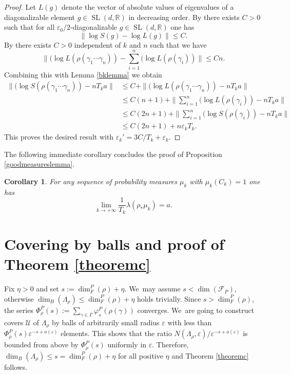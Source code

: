 \documentclass[JEP,XML,SOM,Unicode,NoEqCountersInSection,published]{cedram}
\let\ts\textstyle
\let\epsilon\varepsilon
\newtheorem{corollary}[theorem]{Corollary}
\newcommand{\R}{\mathbb{R}}
\newcommand{\F}{\mathcal{F}}
\newcommand{\U}{\mathcal U}
\let\e\varepsilon
\let\La\Lambda
\DeclareMathOperator{\SL}{SL}
\begin{document}
\begin{proof}
Let \(L(g)\) denote the vector of absolute values of eigenvalues of a diagonalizable element \(g \in \SL(d,\R)\) in decreasing order.
By \cite[Lem.\,2.16]{2021breuillard-sert} there exists \(C > 0\) such that for all \(\e_0/2\)-diagonalizable \(g \in \SL(d,\R)\) one has
\[
\|\log S(g) - \log L(g)\| \le C.
\]
By \cite[Prop.\,2.17]{2021breuillard-sert} there exists \(C > 0\) independent of \(k\) and \(n\) such that we have
\[
\|\ts (\log L(\rho(\gamma_1\cdots \gamma_n)) - \sum_{i = 1}^n (\log L (\rho(\gamma_i))\| \le Cn.
\]
Combining this with Lemma \ref{bklemma} we obtain
\begin{align*}\|(\log S(\rho(\gamma_1 \cdots \gamma_n)) - n T_k a\| &\le C + \|(\log L (\rho(\gamma_1\cdots \gamma_n))- nT_k a\|
\\ &\ts\le C(n+1) + \|\sum_{i = 1}^n(\log L (\rho(\gamma_i)) - nT_k a\|
\\ &\ts\le C(2n+1) + \|\sum_{i = 1}^n(\log S (\rho(\gamma_i))- nT_k a\|
\\ &\le C(2n+1) + n \epsilon_k T_k.
\end{align*}
This proves the desired result with \(\epsilon_k' = 3C / T_k + \epsilon_k\).
\end{proof}

The following immediate corollary concludes the proof of Proposition \ref{goodmeasureslemma}.

\begin{corollary}
For any sequence of probability measures \(\mu_k\) with \(\mu_k(C_k) = 1\) one has
\[
\lim_{k \to +\infty}\frac{1}{T_k}\lambda(\rho_*\mu_k) = a.
\]
\end{corollary}

\section{Covering by balls and proof of Theorem \ref{theoremc}}\label{prooftheoremc}

Fix \(\eta >0\) and set \(s:= \dim_F^P(\rho) + \eta \). We~may assume \(s <\dim (\F_{P}) \), otherwise \(\dim_B (\La_\rho) \leq \dim_F^P(\rho) + \eta \) holds trivially. Since \(s > \dim_F^P(\rho)\), the series
\(\Phi^P_\rho (s) := \sum_{\gamma \in \Gamma}\varphi_s^P(\rho(\gamma))\) converges. We~are going to construct covers \(\U\) of \(\La_\rho \) by balls of arbitrarily small radius \(\e\) with less than \(\Phi^P_\rho(s) \e^{-s+o(\e)}\) elements. This shows that the ratio \(N(\La_\rho, \e)/\e^{-s +o(\e)} \) is bounded from above by \(\Phi^P_\rho (s) \) uniformly in \(\e\). Therefore, \(\dim_B (\La_\rho) \leq s =\dim_F^P (\rho)+\eta\) for all positive \(\eta \) and Theorem \ref{theoremc} follows.
\end{document}
